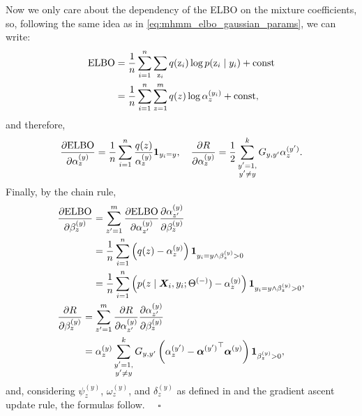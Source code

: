 Now we only care about the dependency of the ELBO on the mixture coefficients, so, following the same idea as in \eqref{eq:mhmm_elbo_gaussian_params}, we can write:
\begin{align}
	\mathrm{ELBO} &= \frac{1}{n}\sum_{i=1}^n \sum_{{\textnormal{z}}_i} q({\textnormal{z}}_i) \log p({\textnormal{z}}_i \mid y_i) + \text{const} \nonumber\\
	&= \frac{1}{n}\sum_{i=1}^n \sum_{z=1}^m q(z) \log {\alpha}^{(y_i)}_{z} + \text{const},
\end{align}
and therefore,
\begin{equation}
	\frac{\partial \mathrm{ELBO}}{\partial {\alpha}^{(y)}_{z}} = \frac{1}{n}\sum_{i=1}^n \frac{q(z)}{{\alpha}^{(y)}_{z}} \bm{1}_{y_i=y}, \quad
	\frac{\partial R}{\partial {\alpha}^{(y)}_{z}} = \frac{1}{2}\sum_{\substack{y'=1,\\y'\neq y}}^{k} {G}_{y,y'} {\alpha}^{(y')}_{z}.
\end{equation}
Finally, by the chain rule,
\begin{align}
	&\frac{\partial \mathrm{ELBO}}{\partial \evbeta^{(y)}_{z}} = \sum_{z'=1}^{m} \frac{\partial \mathrm{ELBO}}{\partial \evalpha^{(y)}_{z'}} \frac{\partial \evalpha^{(y)}_{z'}}{\partial \evbeta^{(y)}_{z}} \nonumber\\
	&\hphantom{\frac{\partial \mathrm{ELBO}}{\partial \evbeta^{(y)}_{z}}} = \frac{1}{n} \sum_{i=1}^n \left(q(z) - \evalpha^{(y)}_{z}\right) \1_{y_i = y \wedge \evbeta^{(y)}_{z} > 0} \nonumber\\
	&\hphantom{\frac{\partial \mathrm{ELBO}}{\partial \evbeta^{(y)}_{z}}} = \frac{1}{n} \sum_{i=1}^n \left(p(z \mid \mX_i, y_i; \Theta^{(-)}) - \evalpha^{(y)}_{z}\right) \1_{y_i = y \wedge \evbeta^{(y)}_{z} > 0}, \\
	&\frac{\partial R}{\partial \evbeta^{(y)}_{z}} = \sum_{z'=1}^{m} \frac{\partial R}{\partial \evalpha^{(y)}_{z'}} \frac{\partial \evalpha^{(y)}_{z'}}{\partial \evbeta^{(y)}_{z}} \nonumber\\
	&\hphantom{\frac{\partial R}{\partial \evbeta^{(y)}_{z}}} = \evalpha^{(y)}_{z} \sum_{\substack{y'=1,\\y'\neq y}}^{k} \emG_{y,y'} \left(\evalpha^{(y')}_{z} - {\valpha^{(y')}} \transp \valpha^{(y)} \right) \1_{\evbeta^{(y)}_{z} > 0},
\end{align}
and, considering $\psi^{(y)}_{z}$, $\omega^{(y)}_{z}$, and $\delta^{(y)}_z$ as defined in  and the gradient ascent update rule, the formulas follow. $\quad \square$

